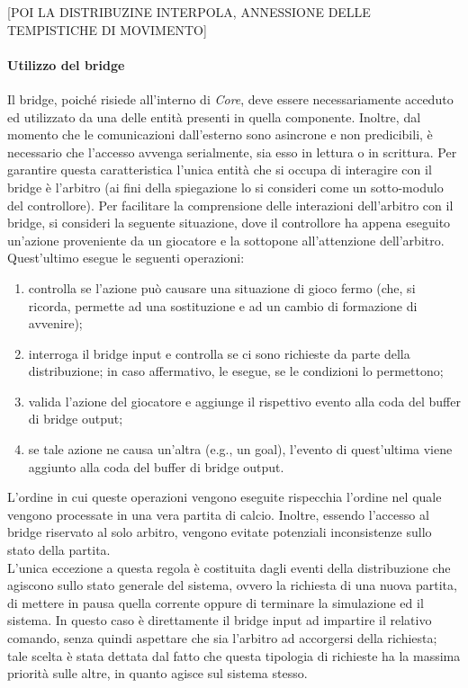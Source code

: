 [POI LA DISTRIBUZINE INTERPOLA, ANNESSIONE DELLE TEMPISTICHE DI MOVIMENTO]\\

\paragraph{Utilizzo del bridge}\label{sec:analisi_distribuzione_bridge_utilizzo} Il bridge, poiché risiede all'interno di \textit{Core}, deve essere necessariamente acceduto ed utilizzato da una delle entità presenti in quella componente. Inoltre, dal momento che le comunicazioni dall'esterno sono asincrone e non predicibili, è necessario che l'accesso avvenga serialmente, sia esso in lettura o in scrittura. Per garantire questa caratteristica l'unica entità che si occupa di interagire con il bridge è l'arbitro (ai fini della spiegazione lo si consideri come un sotto-modulo del controllore). Per facilitare la comprensione delle interazioni dell'arbitro con il bridge, si consideri la seguente situazione, dove il controllore ha appena eseguito un'azione proveniente da un giocatore e la sottopone all'attenzione dell'arbitro. Quest'ultimo esegue le seguenti operazioni:

\begin{enumerate}
	\item controlla se l'azione può causare una situazione di gioco fermo (che, si ricorda, permette ad una sostituzione e ad un cambio di formazione di avvenire);
	\item interroga il bridge input e controlla se ci sono richieste da parte della distribuzione; in caso affermativo, le esegue, se le condizioni lo permettono;
	\item valida l'azione del giocatore e aggiunge il rispettivo evento alla coda del buffer di bridge output;
	\item se tale azione ne causa un'altra (e.g., un goal), l'evento di quest'ultima viene aggiunto alla coda del buffer di bridge output.
\end{enumerate}

L'ordine in cui queste operazioni vengono eseguite rispecchia l'ordine nel quale vengono processate in una vera partita di calcio. Inoltre, essendo l'accesso al bridge riservato al solo arbitro, vengono evitate potenziali inconsistenze sullo stato della partita.\\

L'unica eccezione a questa regola è costituita dagli eventi della distribuzione che agiscono sullo stato generale del sistema, ovvero la richiesta di una nuova partita, di mettere in pausa quella corrente oppure di terminare la simulazione ed il sistema. In questo caso è direttamente il bridge input ad impartire il relativo comando, senza quindi aspettare che sia l'arbitro ad accorgersi della richiesta; tale scelta è stata dettata dal fatto che questa tipologia di richieste ha la massima priorità sulle altre, in quanto agisce sul sistema stesso.

